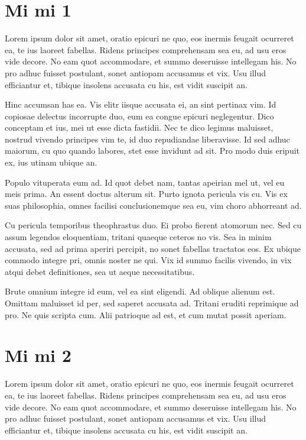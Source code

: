
\chapter{Mi mi 1}

Lorem ipsum dolor sit amet, oratio epicuri ne quo, eos inermis feugait ocurreret ea, te ius laoreet fabellas. Ridens principes comprehensam sea eu, ad usu eros vide decore. No eam quot accommodare, et summo deseruisse intellegam his. No pro adhuc fuisset postulant, sonet antiopam accusamus et vix. Usu illud efficiantur et, tibique insolens accusata cu his, est vidit suscipit an.

Hinc accumsan has ea. Vis elitr iisque accusata ei, an sint pertinax vim. Id copiosae delectus incorrupte duo, eum ea congue epicuri neglegentur. Dico conceptam et ius, mei ut esse dicta fastidii. Nec te dico legimus maluisset, nostrud vivendo principes vim te, id duo repudiandae liberavisse. Id sed adhuc maiorum, cu quo quando labores, stet esse invidunt ad sit. Pro modo duis eripuit ex, ius utinam ubique an.

Populo vituperata eum ad. Id quot debet nam, tantas apeirian mel ut, vel eu meis prima. An essent doctus alterum sit. Purto ignota pericula vis cu. Vis ex suas philosophia, omnes facilisi conclusionemque sea eu, vim choro abhorreant ad.

Cu pericula temporibus theophrastus duo. Ei probo fierent atomorum nec. Sed cu assum legendos eloquentiam, tritani quaeque ceteros no vis. Sea in minim accusata, sed ad prima aperiri percipit, no sonet fabellas tractatos eos. Ex ubique commodo integre pri, omnis noster ne qui. Vix id summo facilis vivendo, in vix atqui debet definitiones, sea ut aeque necessitatibus.

Brute omnium integre id eum, vel ea sint eligendi. Ad oblique alienum est. Omittam maluisset id per, sed saperet accusata ad. Tritani eruditi reprimique ad pro. Ne quis scripta cum. Alii patrioque ad est, et cum mutat possit aperiam.

\newpage

\chapter{Mi mi 2}

Lorem ipsum dolor sit amet, oratio epicuri ne quo, eos inermis feugait ocurreret ea, te ius laoreet fabellas. Ridens principes comprehensam sea eu, ad usu eros vide decore. No eam quot accommodare, et summo deseruisse intellegam his. No pro adhuc fuisset postulant, sonet antiopam accusamus et vix. Usu illud efficiantur et, tibique insolens accusata cu his, est vidit suscipit an.

